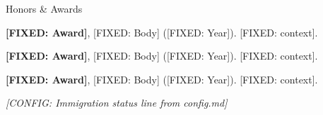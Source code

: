 \documentclass{resume}
\begin{document}

\begin{rSection2}{Honors \& Awards}
\item \textbf{[FIXED: Award]}, [FIXED: Body] ([FIXED: Year]). [FIXED: context].
\item \textbf{[FIXED: Award]}, [FIXED: Body] ([FIXED: Year]). [FIXED: context].
\item \textbf{[FIXED: Award]}, [FIXED: Body] ([FIXED: Year]). [FIXED: context].
\end{rSection2}
\vspace{-0.1cm}


\begin{center}
\vspace{0.15cm}
\textit{[CONFIG: Immigration status line from config.md]}
\end{center}
\end{document}
